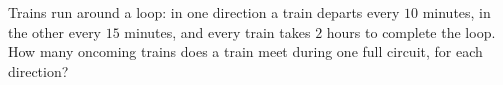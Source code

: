 Trains run around a loop: in one direction a train departs every $10$ minutes, in the other every $15$ minutes, and every train takes $2$ hours to complete the loop. How many oncoming trains does a train meet during one full circuit, for each direction?
